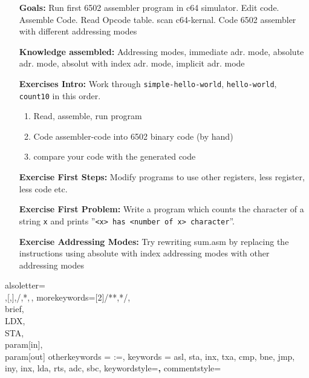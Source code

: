 \documentclass[a4paper]{article}
\begin{document}
 



\setlength\parskip{0.5cm}
\begin{itemize}
\item[\textbf{Goals:}] Run first 6502 assembler program in c64 simulator. Edit code. Assemble Code. Read Opcode table. scan c64-kernal. Code 6502 assembler with different addressing modes
\item[\textbf{Knowledge assembled:}] Addressing modes, immediate adr. mode, absolute adr. mode, absolut with index adr. mode, implicit adr. mode
\item[\textbf{Exercises Intro:}] Work through \texttt{simple-hello-world}, \texttt{hello-world}, \texttt{count10} in this order.

\begin{enumerate}
\item Read, assemble, run program
\item Code assembler-code into 6502 binary code (by hand)
\item compare your code with the generated code
\end{enumerate}

\item[\textbf{Exercise First Steps:}] 
Modify programs to use other registers, less register, less code etc.
\item[\textbf{Exercise First Problem:}] Write a program which counts the character of a string \texttt{x} and prints ''\texttt{<x> has <number of x> character}''.
\item[\textbf{Exercise Addressing Modes:}] Try rewriting sum.asm by replacing the instructions using absolute with index addressing modes with other addressing modes
 \end{itemize} 

%
{
    alsoletter={\\,[,],/,*,\,},%
    morekeywords=[2]{/**,*/,\\brief,%
                     \\LDX,\\STA,\\param[in],\\param[out]}
}
 {
    otherkeywords = {:=},
    keywords = {asl, sta, inx, txa, cmp, bne, jmp, iny, inx, lda, rts, adc, sbc},
    keywordstyle=\textbf,
    commentstyle=\itshape
}
\end{document}
